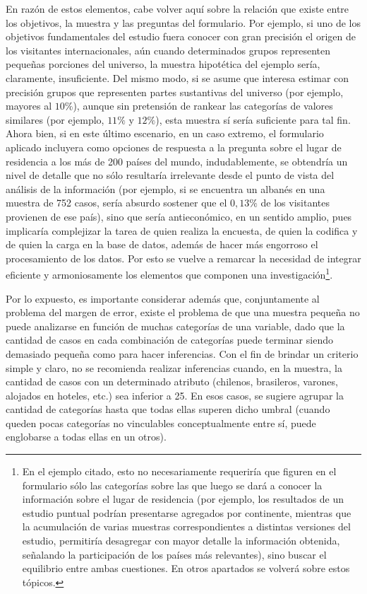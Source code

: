 \documentclass[
]{book}
\begin{document}
En razón de estos elementos, cabe volver aquí sobre la relación que existe entre los objetivos, la muestra y las preguntas del formulario. Por ejemplo, si uno de los objetivos fundamentales del estudio fuera conocer con gran precisión el origen de los visitantes internacionales, aún cuando determinados grupos representen pequeñas porciones del universo, la muestra hipotética del ejemplo sería, claramente, insuficiente. Del mismo modo, si se asume que interesa estimar con precisión grupos que representen partes sustantivas del universo (por ejemplo, mayores al \(10\%\)), aunque sin pretensión de rankear las categorías de valores similares (por ejemplo, \(11\%\) y \(12\%\)), esta muestra sí sería suficiente para tal fin. Ahora bien, si en este último escenario, en un caso extremo, el formulario aplicado incluyera como opciones de respuesta a la pregunta sobre el lugar de residencia a los más de 200 países del mundo, indudablemente, se obtendría un nivel de detalle que no sólo resultaría irrelevante desde el punto de vista del análisis de la información (por ejemplo, si se encuentra un albanés en una muestra de 752 casos, sería absurdo sostener que el \(0,13\%\) de los visitantes provienen de ese país), sino que sería antieconómico, en un sentido amplio, pues implicaría complejizar la tarea de quien realiza la encuesta, de quien la codifica y de quien la carga en la base de datos, además de hacer más engorroso el procesamiento de los datos. Por esto se vuelve a remarcar la necesidad de integrar eficiente y armoniosamente los elementos que componen una investigación\footnote{En el ejemplo citado, esto no necesariamente requeriría que figuren en el formulario sólo las categorías sobre las que luego se dará a conocer la información sobre el lugar de residencia (por ejemplo, los resultados de un estudio puntual podrían presentarse agregados por continente, mientras que la acumulación de varias muestras correspondientes a distintas versiones del estudio, permitiría desagregar con mayor detalle la información obtenida, señalando la participación de los países más relevantes), sino buscar el equilibrio entre ambas cuestiones. En otros apartados se volverá sobre estos tópicos.}.

Por lo expuesto, es importante considerar además que, conjuntamente al problema del margen de error, existe el problema de que una muestra pequeña no puede analizarse en función de muchas categorías de una variable, dado que la cantidad de casos en cada combinación de categorías puede terminar siendo demasiado pequeña como para hacer inferencias. Con el fin de brindar un criterio simple y claro, no se recomienda realizar inferencias cuando, en la muestra, la cantidad de casos con un determinado atributo (chilenos, brasileros, varones, alojados en hoteles, etc.) sea inferior a 25. En esos casos, se sugiere agrupar la cantidad de categorías hasta que todas ellas superen dicho umbral (cuando queden pocas categorías no vinculables conceptualmente entre sí, puede englobarse a todas ellas en un otros).
\end{document}
